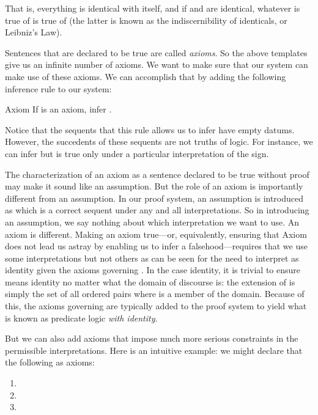 That is, everything is identical with itself, and if  and  are 
identical, whatever is true of  is true of  (the latter is known as 
the indiscernibility of identicals, or Leibniz's Law).

Sentences that are declared to be true are called \emph{axioms}. So the above 
templates give us an infinite number of axioms. We want to make sure that our 
system can make use of these axioms. We can accomplish that by adding the 
following inference rule to our system:

\begin{infrule}
\item[Axiom] If \p{\alpha} is an axiom, infer \p{\seq{}{\alpha}}.
\end{infrule}


Notice that the sequents that this rule allows us to infer have empty datums.  
However, the succedents of these sequents are not truths of logic. For instance, 
we can infer \p{\seq{}{\ident{\kappa}{\kappa}}} but \p{\ident{\kappa}{\kappa}} 
is true only under a particular interpretation of the \p{=} sign. 

The characterization of an axiom as a sentence declared to be true without proof 
may make it sound like an assumption. But the role of an axiom is importantly 
different from an assumption.  In our proof system, an assumption is introduced 
as  which is a correct sequent under any and all interpretations.  
So in introducing an assumption, we say nothing about which interpretation we 
want to use. An axiom is different. Making an axiom true---or, equivalently, 
ensuring that Axiom does not lead us astray by enabling us to infer a 
falsehood---requires that we use some interpretations but not others as can be 
seen for the need to interpret \p{=} as identity given the axioms governing
\p{=}. In the case identity, it is trivial to ensure \p{=} means identity no 
matter what the domain of discourse is: the extension of \p{=} is simply the set 
of all ordered pairs  where  is a 
member of the domain.  Because of this, the axioms governing \p{=} are typically 
added to the proof system to yield what is known as predicate logic \emph{with 
identity}.

But we can also add axioms that impose much more serious constraints in the 
permissible interpretations.  Here is an intuitive example: we might declare 
that the following as axioms:

\begin{enumerate}
 \item {}
 \item {}
 \item {}
 \end{enumerate}
 
